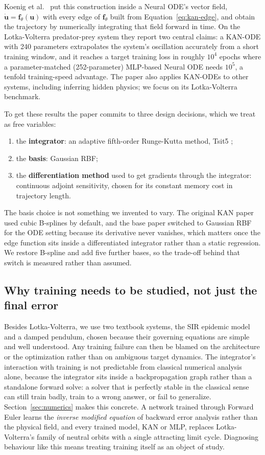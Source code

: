 Koenig et al.\ \cite{koenig2024kanode} put this construction inside a Neural
ODE's vector field, $\dot{\mathbf{u}}=\mathbf{f}_\theta(\mathbf{u})$ with
every edge of $\mathbf{f}_\theta$ built from Equation~\ref{eq:kan-edge}, and
obtain the trajectory by numerically integrating that field forward in time.
On the Lotka-Volterra predator-prey system they report two central claims:
a KAN-ODE with 240 parameters extrapolates the system's oscillation
accurately from a short training window, and it reaches a target training
loss in roughly $10^4$ epochs where a parameter-matched (252-parameter)
MLP-based Neural ODE needs $10^5$, a tenfold training-speed advantage. The
paper also applies KAN-ODEs to other systems, including inferring hidden
physics; we focus on its Lotka-Volterra benchmark.

To get these results the paper commits to three design decisions, which we
treat as free variables:
\begin{enumerate}
\item the \textbf{integrator}: an adaptive fifth-order Runge-Kutta method,
  Tsit5 \cite{tsitouras2011tsit5};
\item the \textbf{basis}: Gaussian RBF;
\item the \textbf{differentiation method} used to get gradients through the
  integrator: continuous adjoint sensitivity, chosen for its constant memory
  cost in trajectory length.
\end{enumerate}
The basis choice is not something we invented to vary. The original KAN
paper \cite{liu2024kan} used cubic B-splines by default, and the base paper
switched to Gaussian RBF for the ODE setting because its derivative never
vanishes, which matters once the edge function sits inside a differentiated
integrator rather than a static regression. We restore B-spline and add five
further bases, so the trade-off behind that switch is measured rather than
assumed.

\subsection{Why training needs to be studied, not just the final error}

Besides Lotka-Volterra, we use two textbook systems, the SIR epidemic model
and a damped pendulum, chosen because their governing equations are simple
and well understood. Any training failure can then be blamed on the
architecture or the optimization rather than on ambiguous target dynamics.
The integrator's interaction with training is not predictable from classical
numerical analysis alone, because the integrator sits inside a
backpropagation graph rather than a standalone forward solve: a solver that
is perfectly stable in the classical sense can still train badly, train to a
wrong answer, or fail to generalize. Section~\ref{sec:numerics} makes this
concrete. A network trained through Forward Euler learns the \emph{inverse
modified equation} of backward error analysis rather than the physical
field, and every trained model, KAN or MLP, replaces Lotka-Volterra's family
of neutral orbits with a single attracting limit cycle. Diagnosing behaviour
like this means treating training itself as an object of study.

